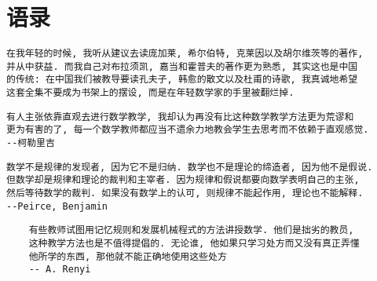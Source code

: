 \chapter{语录}
\begin{verbatim}
在我年轻的时候, 我听从建议去读庞加莱, 希尔伯特, 克莱因以及胡尔维茨等的著作,
并从中获益. 而我自己对布拉须凯, 嘉当和霍普夫的著作更为熟悉, 其实这也是中国
的传统: 在中国我们被教导要读孔夫子, 韩愈的散文以及杜甫的诗歌, 我真诚地希望
这套全集不要成为书架上的摆设, 而是在年轻数学家的手里被翻烂掉.
\end{verbatim}

\begin{verbatim}
有人主张依靠直观去进行数学教学, 我却认为再没有比这种数学教学方法更为荒谬和
更为有害的了, 每一个数学教师都应当不遗余力地教会学生去思考而不依赖于直观感觉.
--柯勒里吉
\end{verbatim}

\begin{verbatim}
数学不是规律的发现者, 因为它不是归纳. 数学也不是理论的缔造者, 因为他不是假说.
但数学却是规律和理论的裁判和主宰者. 因为规律和假说都要向数学表明自己的主张,
然后等待数学的裁判. 如果没有数学上的认可, 则规律不能起作用, 理论也不能解释.
--Peirce, Benjamin
\end{verbatim}

\begin{verbatim}
	有些教师试图用记忆规则和发展机械程式的方法讲授数学. 他们是拙劣的教员, 
	这种教学方法也是不值得提倡的. 无论谁, 他如果只学习处方而又没有真正弄懂
	他所学的东西, 那他就不能正确地使用这些处方
	-- A. Renyi
\end{verbatim}

